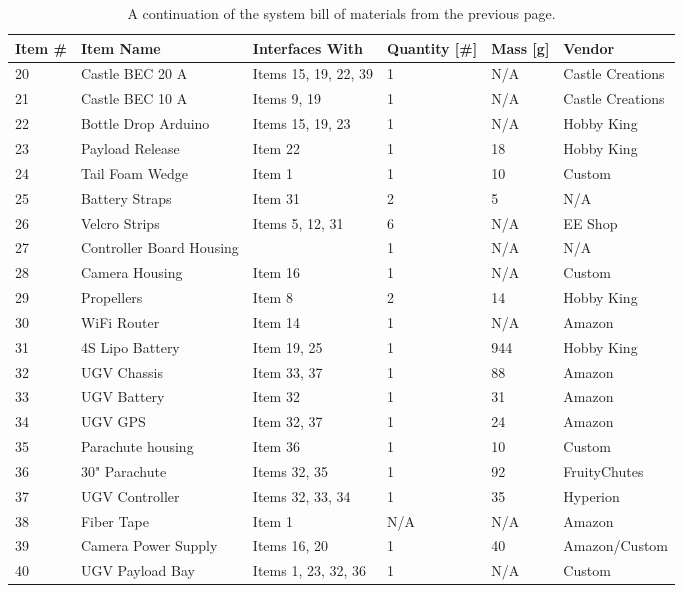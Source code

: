 \documentclass[]{auvsi_doc}
\begin{document}
	\begin{table}[h!]
		\begin{center}
			\caption{A continuation of the system bill of materials from the previous page.}
			\label{table:BOM}
			\begin{tabular}{p{1cm}p{4cm}p{3cm}p{1.5cm}p{1cm}p{2.5cm}}
				\toprule
				Item \# & Item Name & Interfaces With & Quantity [\#] & Mass [g] & Vendor \\
				\midrule
				20 & Castle BEC 20 A & Items 15, 19, 22, 39 & 1 & N/A & Castle \newline Creations \\
				21 & Castle BEC 10 A & Items 9, 19 & 1 & N/A & Castle \newline Creations \\
				22 & Bottle Drop Arduino & Items 15, 19, 23 & 1 & N/A & Hobby King \\
				23 & Payload Release & Item 22 & 1 & 18 & Hobby King \\
				24 & Tail Foam Wedge & Item 1 & 1 & 10 & Custom \\
				25 & Battery Straps & Item 31 & 2 & 5 & N/A \\
				26 & Velcro Strips & Items 5, 12, 31 & 6 & N/A & EE Shop \\
				27 & Controller Board \newline Housing &   & 1 & N/A & N/A \\
				28 & Camera Housing & Item 16 & 1 & N/A & Custom \\
				29 & Propellers & Item 8 & 2 & 14 & Hobby King \\
				30 & WiFi Router & Item 14 & 1 & N/A & Amazon \\
				31 & 4S Lipo Battery & Item 19, 25 & 1 & 944 & Hobby King \\
				32 & UGV Chassis & Item 33, 37 & 1 & 88 & Amazon \\
				33 & UGV Battery & Item 32 & 1 & 31 & Amazon \\
				34 & UGV GPS & Item 32, 37 & 1 & 24 & Amazon \\
				35 & Parachute housing & Item 36 & 1 & 10 & Custom \\
				36 & 30" Parachute & Items 32, 35 & 1 & 92 & FruityChutes \\
				37 & UGV Controller & Items 32, 33, 34 & 1 & 35 & Hyperion \\
				38 & Fiber Tape & Item 1 & N/A & N/A & Amazon \\
				39 & Camera Power Supply & Items 16, 20 & 1 & 40 & Amazon/Custom \\
				40 & UGV Payload Bay & Items 1, 23, 32, 36 & 1 & N/A & Custom \\

				\bottomrule
			\end{tabular}
		\end{center}
	\end{table}
\end{document}
